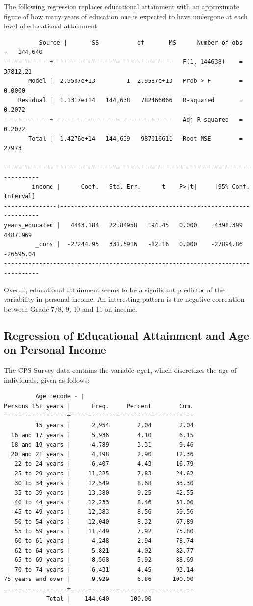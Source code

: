 \documentclass{article}
\begin{document}
The following regression replaces educational attainment with an approximate figure of how many years of education one is expected to have undergone at each level of educational attainment

\begin{verbatim}
	      Source |       SS           df       MS      Number of obs   =   144,640
-------------+----------------------------------   F(1, 144638)    =  37812.21
       Model |  2.9587e+13         1  2.9587e+13   Prob > F        =    0.0000
    Residual |  1.1317e+14   144,638   782466066   R-squared       =    0.2072
-------------+----------------------------------   Adj R-squared   =    0.2072
       Total |  1.4276e+14   144,639   987016611   Root MSE        =     27973

--------------------------------------------------------------------------------
        income |      Coef.   Std. Err.      t    P>|t|     [95% Conf. Interval]
---------------+----------------------------------------------------------------
years_educated |   4443.184   22.84958   194.45   0.000     4398.399    4487.969
         _cons |  -27244.95   331.5916   -82.16   0.000    -27894.86   -26595.04
--------------------------------------------------------------------------------
\end{verbatim}

Overall, educational attainment seems to be a significant predictor of the variability in personal income. An interesting pattern is the negative correlation between Grade 7/8, 9, 10 and 11 on income. 

\subsection*{Regression of Educational Attainment and Age on Personal Income}
The CPS Survey data contains the variable $age1$, which discretizes the age of individuals, given as follows:
\begin{verbatim}
	     Age recode - |
Persons 15+ years |      Freq.     Percent        Cum.
------------------+-----------------------------------
         15 years |      2,954        2.04        2.04
  16 and 17 years |      5,936        4.10        6.15
  18 and 19 years |      4,789        3.31        9.46
  20 and 21 years |      4,198        2.90       12.36
   22 to 24 years |      6,407        4.43       16.79
   25 to 29 years |     11,325        7.83       24.62
   30 to 34 years |     12,549        8.68       33.30
   35 to 39 years |     13,380        9.25       42.55
   40 to 44 years |     12,233        8.46       51.00
   45 to 49 years |     12,383        8.56       59.56
   50 to 54 years |     12,040        8.32       67.89
   55 to 59 years |     11,449        7.92       75.80
   60 to 61 years |      4,248        2.94       78.74
   62 to 64 years |      5,821        4.02       82.77
   65 to 69 years |      8,568        5.92       88.69
   70 to 74 years |      6,431        4.45       93.14
75 years and over |      9,929        6.86      100.00
------------------+-----------------------------------
            Total |    144,640      100.00
\end{verbatim}
\end{document}
